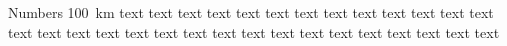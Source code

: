 \documentclass{article}
\begin{document}
Numbers \SI{100}{\km}
text text text text text text text text text text text text text text text
text text text text text text text text text text text text text text text
\end{document}
